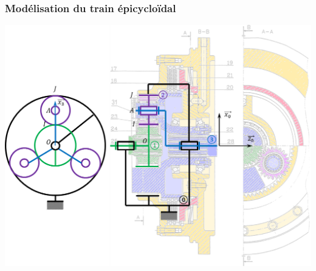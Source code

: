 \documentclass[10pt,oneside]{article}
\begin{document}
\subsubsection{Modélisation du train épicycloïdal}
\begin{minipage}[c]{.8\linewidth}
\begin{center}
\includegraphics[width=\textwidth]{png/schema_epi}
\end{center}
\end{minipage}
\end{document}
